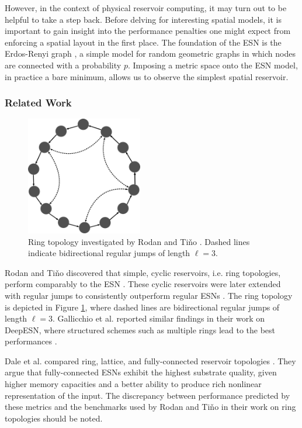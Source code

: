 However, in the context of physical reservoir computing, it may turn out to be
helpful to take a step back. Before delving for interesting spatial models, it
is important to gain insight into the performance penalties one might expect
from enforcing a spatial layout in the first place. The foundation of the ESN is
the Erdos-Renyi graph \cite{erdos_random_1959}, a simple model for random
geometric graphs in which nodes are connected with a probability $p$. Imposing a
metric space onto the ESN model, in practice a bare minimum, allows us to
observe the simplest spatial reservoir.

\subsubsection{Related Work}

\begin{figure}[t!]
  \centering
  \includegraphics[width=2in]{figures/ring.png}
  \caption{
    Ring topology investigated by Rodan and Tiňo \cite{rodan_minimum_2011,
rodan_simple_2012}. Dashed lines indicate bidirectional regular jumps of length
$\ell = 3$.
  }
  \label{fig:ring-example}
\end{figure}

Rodan and Tiňo discovered that simple, cyclic reservoirs, i.e. ring topologies,
perform comparably to the ESN \cite{rodan_minimum_2011}. These cyclic reservoirs
were later extended with regular jumps to consistently outperform regular ESNs
\cite{rodan_simple_2012}. The ring topology is depicted in Figure
\ref{fig:ring-example}, where dashed lines are bidirectional regular jumps of
length $\ell = 3$. Gallicchio et al. reported similar findings in their work on
DeepESN, where structured schemes such as multiple rings lead to the best
performances \cite{gallicchio_reservoir_2019}.

Dale et al. compared ring, lattice, and fully-connected reservoir topologies
\cite{mcquillan_role_2019}.  They argue that fully-connected ESNs exhibit the
highest substrate quality, given higher memory capacities and a better ability
to produce rich nonlinear representation of the input. The discrepancy between
performance predicted by these metrics and the benchmarks used by Rodan and Tiňo
in their work on ring topologies should be noted.

